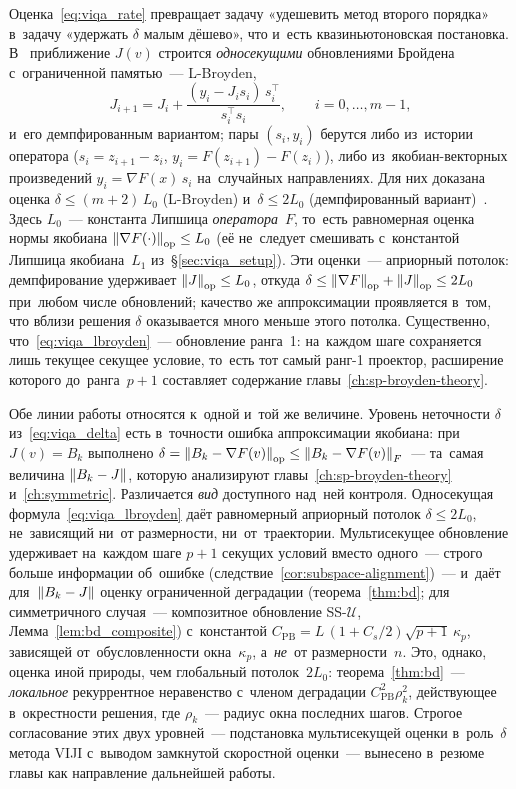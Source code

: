 Оценка~\eqref{eq:viqa_rate} превращает задачу «удешевить метод второго
порядка» в~задачу «удержать $\delta$ малым дёшево», что и~есть
квазиньютоновская постановка. В~\cite{viqa2024} приближение $J(v)$
строится \emph{односекущими} обновлениями Бройдена с~ограниченной
памятью~--- L-Broyden,
\begin{equation}\label{eq:viqa_lbroyden}
  J_{i+1} = J_i + \frac{(y_i - J_i s_i)\,s_i^\top}{s_i^\top s_i},
  \qquad i = 0,\dots,m-1,
\end{equation}
и~его демпфированным вариантом; пары $(s_i,y_i)$ берутся либо из~истории
оператора ($s_i=z_{i+1}-z_i$, $y_i=F(z_{i+1})-F(z_i)$), либо из~якобиан-векторных
произведений $y_i=\nabla F(x)\,s_i$ на~случайных направлениях. Для них
доказана оценка $\delta\le(m{+}2)\,L_0$ (L-Broyden) и~$\delta\le 2L_0$
(демпфированный вариант)~\cite{viqa2024}. Здесь $L_0$~--- константа Липшица
\emph{оператора}~$F$, то~есть равномерная оценка нормы якобиана
$\left\|\nabla F(\cdot)\right\|_{\mathrm{op}}\le L_0$ (её не~следует смешивать
с~константой Липшица якобиана~$L_1$ из~\S\ref{sec:viqa_setup}). Эти
оценки~--- априорный потолок: демпфирование удерживает
$\left\|J\right\|_{\mathrm{op}}\le L_0$, откуда
$\delta\le\left\|\nabla F\right\|_{\mathrm{op}}+\left\|J\right\|_{\mathrm{op}}\le 2L_0$
при~любом числе обновлений; качество же аппроксимации проявляется в~том,
что вблизи решения $\delta$ оказывается много меньше этого потолка. Существенно, что~\eqref{eq:viqa_lbroyden}~---
обновление ранга~1: на~каждом шаге сохраняется лишь текущее секущее
условие, то~есть тот самый ранг-1 проектор, расширение которого
до~ранга~$p{+}1$ составляет содержание главы~\ref{ch:sp-broyden-theory}.

Обе линии работы относятся к~одной и~той же величине. Уровень неточности
$\delta$ из~\eqref{eq:viqa_delta} есть в~точности ошибка аппроксимации
якобиана: при~$J(v)=B_k$ выполнено
$\delta=\left\|B_k-\nabla F(v)\right\|_{\mathrm{op}}\le\left\|B_k-\nabla F(v)\right\|_F$~---
та~самая величина $\left\|B_k-J\right\|$, которую анализируют
главы~\ref{ch:sp-broyden-theory} и~\ref{ch:symmetric}. Различается \emph{вид}
доступного над~ней контроля. Односекущая формула~\eqref{eq:viqa_lbroyden}
даёт равномерный априорный потолок $\delta\le 2L_0$, не~зависящий ни~от
размерности, ни~от~траектории. Мультисекущее обновление удерживает
на~каждом шаге $p{+}1$ секущих условий вместо одного~--- строго больше
информации об~ошибке (следствие~\ref{cor:subspace-alignment})~--- и~даёт
для~$\left\|B_k-J\right\|$ оценку ограниченной деградации (теорема~\ref{thm:bd}; для
симметричного случая~--- композитное обновление SS-$\mathcal{U}$,
Лемма~\ref{lem:bd_composite}) с~константой
$C_{\mathrm{PB}} = L\,(1{+}C_s/2)\sqrt{p+1}\,\kappa_p$, зависящей
от~обусловленности окна~$\kappa_p$, а~\emph{не}~от размерности~$n$. Это,
однако, оценка иной природы, чем глобальный потолок~$2L_0$:
теорема~\ref{thm:bd}~--- \emph{локальное} рекуррентное неравенство с~членом
деградации $C_{\mathrm{PB}}^2\rho_k^2$, действующее в~окрестности решения,
где $\rho_k$~--- радиус окна последних шагов. Строгое согласование этих
двух уровней~--- подстановка мультисекущей оценки в~роль~$\delta$ метода
VIJI с~выводом замкнутой скоростной оценки~--- вынесено в~резюме главы как
направление дальнейшей работы.

